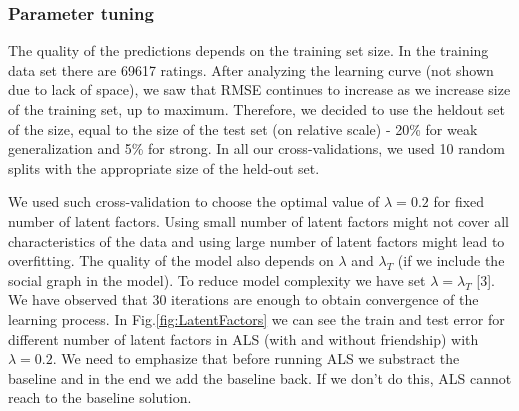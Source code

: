 \documentclass{article} %
\begin{document}
\subsubsection{Parameter tuning}



The quality of the predictions depends on the training set size. 
In the training data set there are 69617 ratings. After analyzing the learning
curve (not shown due to lack of space), we saw that RMSE continues to increase
as we increase size of the training set, up to maximum. Therefore, we decided to
use the heldout set of the size, equal to the size of the test set (on relative
scale) - 20\% for weak generalization and 5\% for strong. In all our
cross-validations, we used 10 random splits with the appropriate size of the
held-out set.

 
 We used such cross-validation to choose
 the optimal value of $\lambda=0.2$ for fixed number of latent factors. Using
 small number of latent factors might not cover all characteristics of the 
 data and using large number of latent factors might lead
 to overfitting. 
 The quality of the model also depends on $\lambda$ and $\lambda_{T}$ (if we
include the social graph in the model).
To reduce model complexity we have set $\lambda=\lambda_{T}$ [3].  
 We have observed that 30 iterations are enough to obtain convergence of the learning process. 
 In Fig.\ref{fig:LatentFactors} we can see the train and test error for 
 different number of latent factors in ALS (with and without friendship) with $\lambda=0.2$. 
 We need to emphasize that before running ALS we substract the baseline and in the 
 end we add the baseline back. If we don't do this, ALS cannot reach to the baseline solution.




\end{document}
